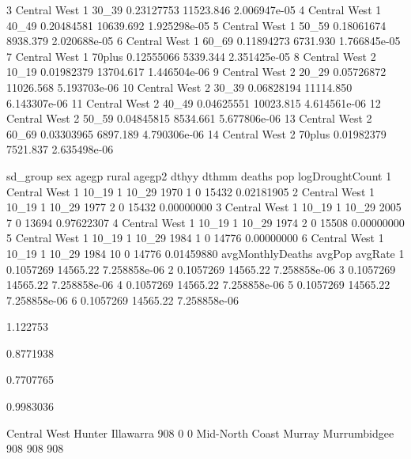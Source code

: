 \documentclass[a4paper]{article}                %
\begin{document}
\begin{Schunk}
\begin{Soutput}
3  Central West   1  30_39       0.23127753 11523.846 2.006947e-05
4  Central West   1  40_49       0.20484581 10639.692 1.925298e-05
5  Central West   1  50_59       0.18061674  8938.379 2.020688e-05
6  Central West   1  60_69       0.11894273  6731.930 1.766845e-05
7  Central West   1 70plus       0.12555066  5339.344 2.351425e-05
8  Central West   2  10_19       0.01982379 13704.617 1.446504e-06
9  Central West   2  20_29       0.05726872 11026.568 5.193703e-06
10 Central West   2  30_39       0.06828194 11114.850 6.143307e-06
11 Central West   2  40_49       0.04625551 10023.815 4.614561e-06
12 Central West   2  50_59       0.04845815  8534.661 5.677806e-06
13 Central West   2  60_69       0.03303965  6897.189 4.790306e-06
14 Central West   2 70plus       0.01982379  7521.837 2.635498e-06
\end{Soutput}
\begin{Soutput}
      sd_group sex agegp rural agegp2 dthyy dthmm deaths   pop logDroughtCount
1 Central West   1 10_19     1  10_29  1970     1      0 15432      0.02181905
2 Central West   1 10_19     1  10_29  1977     2      0 15432      0.00000000
3 Central West   1 10_19     1  10_29  2005     7      0 13694      0.97622307
4 Central West   1 10_19     1  10_29  1974     2      0 15508      0.00000000
5 Central West   1 10_19     1  10_29  1984     1      0 14776      0.00000000
6 Central West   1 10_19     1  10_29  1984    10      0 14776      0.01459880
  avgMonthlyDeaths   avgPop      avgRate
1        0.1057269 14565.22 7.258858e-06
2        0.1057269 14565.22 7.258858e-06
3        0.1057269 14565.22 7.258858e-06
4        0.1057269 14565.22 7.258858e-06
5        0.1057269 14565.22 7.258858e-06
6        0.1057269 14565.22 7.258858e-06
\end{Soutput}
\begin{Soutput}
[1] 1.122753
\end{Soutput}
\begin{Soutput}
[1] 0.8771938
\end{Soutput}
\begin{Soutput}
[1] 0.7707765
\end{Soutput}
\begin{Soutput}
[1] 0.9983036
\end{Soutput}
\begin{Soutput}
         Central West                Hunter             Illawarra 
                  908                     0                     0 
      Mid-North Coast                Murray          Murrumbidgee 
                  908                   908                   908 

\end{Soutput}
\end{Schunk}
\end{document}
